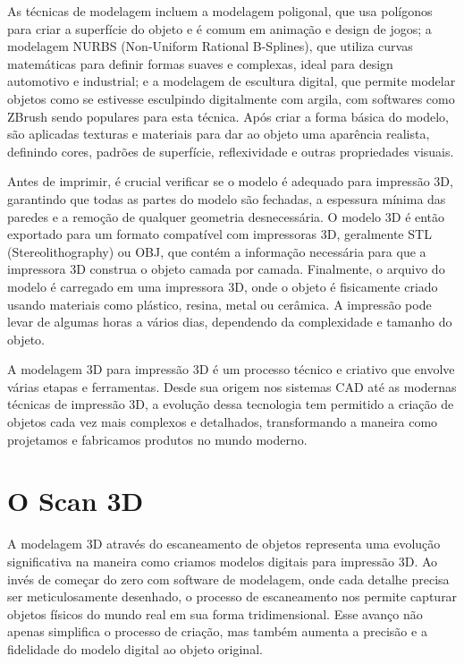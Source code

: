 As técnicas de modelagem incluem a modelagem poligonal, que usa polígonos para criar a superfície do objeto e é comum em animação e design de jogos; a modelagem NURBS (Non-Uniform Rational B-Splines), que utiliza curvas matemáticas para definir formas suaves e complexas, ideal para design automotivo e industrial; e a modelagem de escultura digital, que permite modelar objetos como se estivesse esculpindo digitalmente com argila, com softwares como ZBrush sendo populares para esta técnica. Após criar a forma básica do modelo, são aplicadas texturas e materiais para dar ao objeto uma aparência realista, definindo cores, padrões de superfície, reflexividade e outras propriedades visuais.

Antes de imprimir, é crucial verificar se o modelo é adequado para impressão 3D, garantindo que todas as partes do modelo são fechadas, a espessura mínima das paredes e a remoção de qualquer geometria desnecessária. O modelo 3D é então exportado para um formato compatível com impressoras 3D, geralmente STL (Stereolithography) ou OBJ, que contém a informação necessária para que a impressora 3D construa o objeto camada por camada. Finalmente, o arquivo do modelo é carregado em uma impressora 3D, onde o objeto é fisicamente criado usando materiais como plástico, resina, metal ou cerâmica. A impressão pode levar de algumas horas a vários dias, dependendo da complexidade e tamanho do objeto.

A modelagem 3D para impressão 3D é um processo técnico e criativo que envolve várias etapas e ferramentas. Desde sua origem nos sistemas CAD até as modernas técnicas de impressão 3D, a evolução dessa tecnologia tem permitido a criação de objetos cada vez mais complexos e detalhados, transformando a maneira como projetamos e fabricamos produtos no mundo moderno.

\section{O Scan 3D}

A modelagem 3D através do escaneamento de objetos representa uma evolução significativa na maneira como criamos modelos digitais para impressão 3D. Ao invés de começar do zero com software de modelagem, onde cada detalhe precisa ser meticulosamente desenhado, o processo de escaneamento nos permite capturar objetos físicos do mundo real em sua forma tridimensional. Esse avanço não apenas simplifica o processo de criação, mas também aumenta a precisão e a fidelidade do modelo digital ao objeto original.

